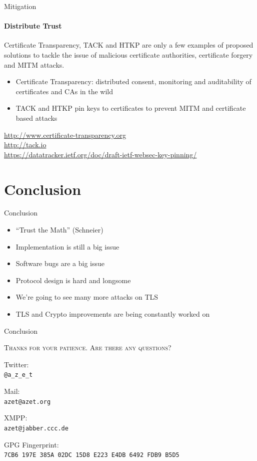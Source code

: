 \documentclass[hyperref={draft}]{beamer}
\begin{document}
\begin{frame}{Mitigation}
  \framesubtitle{Distribute Trust}
  Certificate Transparency, TACK and HTKP are only a few examples of proposed solutions to tackle the issue of malicious certificate authorities, certificate forgery and MITM attacks.

  \begin{itemize}
    \item Certificate Transparency: distributed consent, monitoring and auditability of certificates and CAs in the wild
    \item TACK and HTKP pin keys to certificates to prevent MITM and certificate based attacks
  \end{itemize}

  \vspace{50px}

  \tiny
  \url{http://www.certificate-transparency.org}\\
  \url{http://tack.io}\\
  \url{https://datatracker.ietf.org/doc/draft-ietf-websec-key-pinning/}
\end{frame}

\section{Conclusion}
\begin{frame}{Conclusion}
  \begin{itemize}
    \item ``Trust the Math'' (Schneier)
    \item Implementation is still a big issue
    \item Software bugs are a big issue
    \item Protocol design is hard and longsome
    \item We're going to see many more attacks on TLS
    \item TLS and Crypto improvements are being constantly worked on
  \end{itemize} 
\end{frame}

\begin{frame}{Conclusion}
  \begin{center}
    \textsc{Thanks for your patience. Are there any questions?}
  \end{center}
  \begin{center}
    Twitter:\\
    \texttt{@a\_z\_e\_t}
    
    
    Mail:\\
    \texttt{azet@azet.org}
    
    
    XMPP:\\
    \texttt{azet@jabber.ccc.de}
    
    
    GPG Fingerprint:\\
    \texttt{7CB6 197E 385A 02DC 15D8 E223 E4DB 6492 FDB9 B5D5}
  \end{center}
\end{frame}


\end{document}

